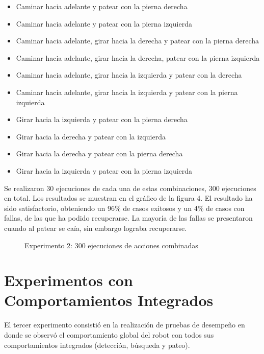 \begin{itemize}
\setlength{\itemsep}{1pt}
\item Caminar hacia adelante y patear con la pierna derecha 
\item Caminar hacia adelante y patear con la pierna izquierda
\item Caminar hacia adelante, girar hacia la derecha y patear con la pierna derecha
\item Caminar hacia adelante, girar hacia la derecha, patear con la pierna izquierda 
\item Caminar hacia adelante, girar hacia la izquierda y patear con la derecha
\item Caminar hacia adelante, girar hacia la  izquierda y  patear con la pierna izquierda
\item Girar hacia la izquierda y patear con la pierna derecha
\item Girar hacia la derecha y patear con la izquierda
\item Girar hacia la derecha y patear con la pierna derecha
\item Girar hacia la izquierda y patear con la pierna izquierda
 \end{itemize}

Se realizaron 30 ejecuciones de cada una de estas combinaciones, 300 ejecuciones en total. Los resultados se muestran en el gráfico de la figura 4. El resultado ha sido satisfactorio, obteniendo un 96\% de casos exitosos y un 4\% de casos con fallas, de las que ha podido recuperarse. La mayoría de las fallas se presentaron cuando al patear se caía, sin embargo lograba recuperarse.  

\begin{figure}[th!]

\caption{Experimento 2: 300 ejecuciones de acciones combinadas}
\end{figure}

\section{Experimentos con Comportamientos Integrados}
\label{sec:experimentosintegrados}

El tercer experimento consistió en la realización de pruebas de desempeño en donde se observó el comportamiento global del robot con todos sus comportamientos integrados (detección, búsqueda y pateo).

